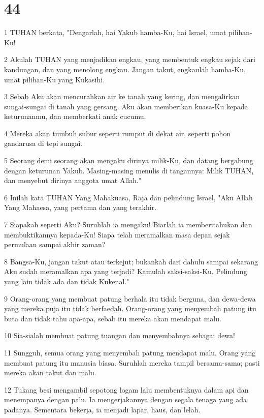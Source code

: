 \chapter{44}

\par 1 TUHAN berkata, "Dengarlah, hai Yakub hamba-Ku, hai Israel, umat pilihan-Ku!
\par 2 Akulah TUHAN yang menjadikan engkau, yang membentuk engkau sejak dari kandungan, dan yang menolong engkau. Jangan takut, engkaulah hamba-Ku, umat pilihan-Ku yang Kukasihi.
\par 3 Sebab Aku akan mencurahkan air ke tanah yang kering, dan mengalirkan sungai-sungai di tanah yang gersang. Aku akan memberikan kuasa-Ku kepada keturunanmu, dan memberkati anak cucumu.
\par 4 Mereka akan tumbuh subur seperti rumput di dekat air, seperti pohon gandarusa di tepi sungai.
\par 5 Seorang demi seorang akan mengaku dirinya milik-Ku, dan datang bergabung dengan keturunan Yakub. Masing-masing menulis di tangannya: Milik TUHAN, dan menyebut dirinya anggota umat Allah."
\par 6 Inilah kata TUHAN Yang Mahakuasa, Raja dan pelindung Israel, "Aku Allah Yang Mahaesa, yang pertama dan yang terakhir.
\par 7 Siapakah seperti Aku? Suruhlah ia mengaku! Biarlah ia memberitahukan dan membuktikannya kepada-Ku! Siapa telah meramalkan masa depan sejak permulaan sampai akhir zaman?
\par 8 Bangsa-Ku, jangan takut atau terkejut; bukankah dari dahulu sampai sekarang Aku sudah meramalkan apa yang terjadi? Kamulah saksi-saksi-Ku. Pelindung yang lain tidak ada dan tidak Kukenal."
\par 9 Orang-orang yang membuat patung berhala itu tidak berguna, dan dewa-dewa yang mereka puja itu tidak berfaedah. Orang-orang yang menyembah patung itu buta dan tidak tahu apa-apa, sebab itu mereka akan mendapat malu.
\par 10 Sia-sialah membuat patung tuangan dan menyembahnya sebagai dewa!
\par 11 Sungguh, semua orang yang menyembah patung mendapat malu. Orang yang membuat patung itu manusia biasa. Suruhlah mereka tampil bersama-sama; pasti mereka akan takut dan malu.
\par 12 Tukang besi mengambil sepotong logam lalu membentuknya dalam api dan menempanya dengan palu. Ia mengerjakannya dengan segala tenaga yang ada padanya. Sementara bekerja, ia menjadi lapar, haus, dan lelah.
